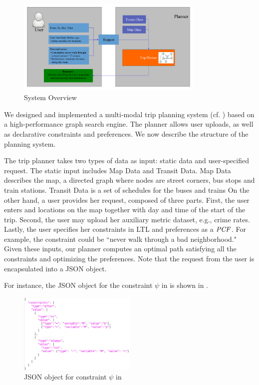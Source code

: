 
\begin{figure}[!ht]
  \centering
    \includegraphics[width=0.8\textwidth]{figs/system.pdf}
  \caption{System Overview\label{fig:system}}
\end{figure}
We designed and implemented a multi-modal trip planning
system (cf. ) based on a 
high-performance graph search engine.
The planner allows user uploads, as well as declarative
constraints and preferences.
We now describe the structure of the planning system.

The trip planner takes two types of data as input:
static data and user-specified request.
The static input includes Map Data and Transit
Data.
Map Data describes the map, a directed graph where 
nodes are street corners, bus stops and train stations.
Transit Data is a set of schedules for the buses and trains
On the other hand, a user provides her request, composed of 
three parts.
First, the user enters  and  locations 
on the map together with day and time of the start of the trip.  
Second, the user may upload her auxiliary metric dataset, e.g., crime rates.  
Lastly, the user specifies her constraints in LTL and preferences as a $\mathit{PCF}$.
For example, the constraint 
could be ``never walk through a bad neighborhood."  Given these 
inputs, our planner computes an optimal path satisfying 
all the constraints and optimizing the preferences.
Note that the request from the user is encapsulated into
a JSON object.

For instance, the JSON object for the constraint $\psi$ in 
is shown in .
\begin{figure}[!ht]
  \centering
    \includegraphics[width=0.5\textwidth]{figs/exampleJSON.png}
  \caption{JSON object for constraint $\psi$ in \label{fig:exJSON}}
\end{figure}
